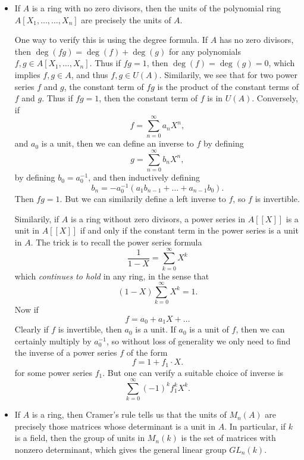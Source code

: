 \begin{itemize}
    \item If $A$ is a ring with no zero divisors, then the units of the polynomial ring $A[X_1, \dots, \dots, X_n]$ are precisely the units of $A$.

    One way to verify this is using the degree formula. If $A$ has no zero divisors, then $\deg(fg) = \deg(f) + \deg(g)$ for any polynomials $f,g \in A[X_1, \dots, X_n]$. Thus if $fg = 1$, then $\deg(f) = \deg(g) = 0$, which implies $f,g \in A$, and thus $f,g \in U(A)$. Similarily, we see that for two power series $f$ and $g$, the constant term of $fg$ is the product of the constant terms of $f$ and $g$. Thus if $fg = 1$, then the constant term of $f$ is in $U(A)$. Conversely, if
    \[ f = \sum_{n = 0}^\infty a_n X^n, \]
    and $a_0$ is a unit, then we can define an inverse to $f$ by defining
    \[ g = \sum_{n = 0}^\infty b_n X^n, \]
    by defining $b_0 = a_0^{-1}$, and then inductively defining
    \[ b_n = -a_0^{-1}(a_1b_{n-1} + \dots + a_{n-1}b_0). \]
    Then $fg = 1$. But we can similarily define a left inverse to $f$, so $f$ is invertible.

    Similarily, if $A$ is a ring without zero divisors, a power series in $A[[X]]$ is a unit in $A[[X]]$ if and only if the constant term in the power series is a unit in $A$. The trick is to recall the power series formula
    \[ \frac{1}{1 - X} = \sum_{k = 0}^\infty X^k \]
    which \emph{continues to hold} in any ring, in the sense that
    \[ (1 - X) \sum_{k = 0}^\infty X^k = 1. \]
    Now if
    \[ f = a_0 + a_1X + \dots \]
    Clearly if $f$ is invertible, then $a_0$ is a unit. If $a_0$ is a unit of $f$, then we can certainly multiply by $a_0^{-1}$, so without loss of generality we only need to find the inverse of a power series $f$ of the form
    \[ f = 1 + f_1 \cdot X. \]
    for some power series $f_1$. But one can verify a suitable choice of inverse is
    \[ \sum_{k = 0}^\infty (-1)^k f_1^k X^k. \]

    \item If $A$ is a ring, then Cramer's rule tells us that the units of $M_n(A)$ are precisely those matrices whose determinant is a unit in $A$. In particular, if $k$ is a field, then the group of units in $M_n(k)$ is the set of matrices with nonzero determinant, which gives the general linear group $GL_n(k)$.


\end{itemize}
